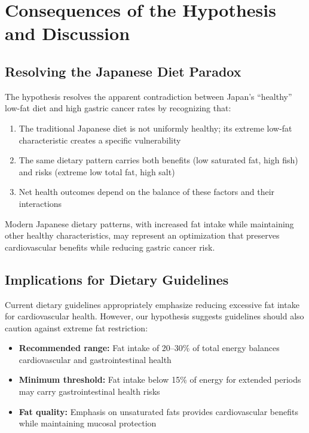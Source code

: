 \documentclass[review]{elsarticle}
\begin{document}
\section{Consequences of the Hypothesis and Discussion}

\subsection{Resolving the Japanese Diet Paradox}

The hypothesis resolves the apparent contradiction between Japan's ``healthy'' low-fat diet and high gastric cancer rates by recognizing that:

\begin{enumerate}
    \item The traditional Japanese diet is not uniformly healthy; its extreme low-fat characteristic creates a specific vulnerability
    \item The same dietary pattern carries both benefits (low saturated fat, high fish) and risks (extreme low total fat, high salt)
    \item Net health outcomes depend on the balance of these factors and their interactions
\end{enumerate}

Modern Japanese dietary patterns, with increased fat intake while maintaining other healthy characteristics, may represent an optimization that preserves cardiovascular benefits while reducing gastric cancer risk.

\subsection{Implications for Dietary Guidelines}

Current dietary guidelines appropriately emphasize reducing excessive fat intake for cardiovascular health. However, our hypothesis suggests guidelines should also caution against extreme fat restriction:

\begin{itemize}
    \item \textbf{Recommended range:} Fat intake of 20--30\% of total energy balances cardiovascular and gastrointestinal health
    \item \textbf{Minimum threshold:} Fat intake below 15\% of energy for extended periods may carry gastrointestinal health risks
    \item \textbf{Fat quality:} Emphasis on unsaturated fats provides cardiovascular benefits while maintaining mucosal protection
\end{itemize}
\end{document}
